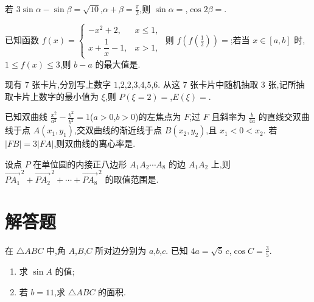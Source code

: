 \begin{problem}
若 \(3\sin\alpha-\sin\beta=\sqrt{10}\),\(\alpha+\beta=\frac{\pi}{2}\),则 \(\sin\alpha=\)\fillinblank{},\(\cos 2\beta=\)\fillinblank{}.
\end{problem}

\begin{problem}
已知函数
\(f(x)=\begin{cases}
-x^2+2,&x\le 1,\\
x+\dfrac{1}{x}-1,&x>1,
\end{cases}\)
则 \(f\left(f\left(\frac12\right)\right)=\)\fillinblank{};若当 \(x\in[a,b]\) 时,\(1\le f(x)\le 3\),则 \(b-a\) 的最大值是\fillinblank{}.
\end{problem}

\begin{problem}
现有 7 张卡片,分别写上数字 \(1\),\(2\),\(2\),\(3\),\(4\),\(5\),\(6\). 从这 7 张卡片中随机抽取 3 张,记所抽取卡片上数字的最小值为 \(\xi\),则 \(P(\xi=2)=\)\fillinblank{},\(E(\xi)=\)\fillinblank{}.
\end{problem}

\begin{problem}
已知双曲线 \(\frac{x^2}{a^2}-\frac{y^2}{b^2}=1\)(\(a>0\),\(b>0\))的左焦点为 \(F\),过 \(F\) 且斜率为 \(\frac{b}{4a}\) 的直线交双曲线于点 \(A(x_1,y_1)\),交双曲线的渐近线于点 \(B(x_2,y_2)\),且 \(x_1<0<x_2\). 若 \(|FB|=3|FA|\),则双曲线的离心率是\fillinblank{}.
\end{problem}

\begin{problem}
设点 \(P\) 在单位圆的内接正八边形 \(A_1A_2\cdots A_8\) 的边 \(A_1A_2\) 上,则 \(\overrightarrow{PA_1}^{\,2}+\overrightarrow{PA_2}^{\,2}+\cdots+\overrightarrow{PA_8}^{\,2}\) 的取值范围是\fillinblank{}.
\end{problem}

\section{解答题}

\begin{problem}
在 \(\triangle ABC\) 中,角 \(A\),\(B\),\(C\) 所对边分别为 \(a\),\(b\),\(c\). 已知 \(4a=\sqrt5\,c\),\(\cos C=\frac35\).

\begin{enumerate}
\item 求 \(\sin A\) 的值;

\item 若 \(b=11\),求 \(\triangle ABC\) 的面积.
\end{enumerate}
\end{problem}

